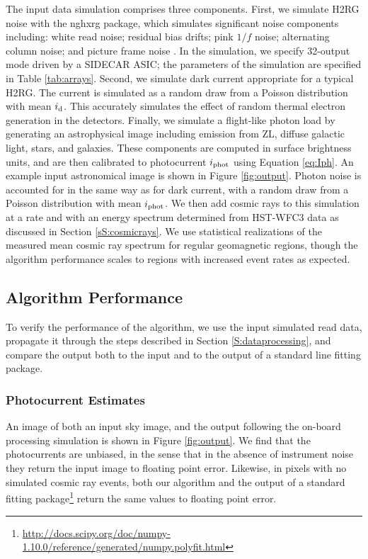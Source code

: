 \documentclass{ws-jai}
\begin{document}
The input data simulation comprises three components.  First, we
simulate H2RG noise with the {\sc nghxrg} package, which simulates
significant noise components including: white read noise; residual
bias drifts; pink $1/f$ noise; alternating column noise; and picture
frame noise \citep{Rauscher2015}. In the simulation, we specify
32-output mode driven by a SIDECAR ASIC; the parameters of the
simulation are specified in Table \ref{tab:arrays}.  Second, we
simulate dark current appropriate for a typical H2RG.  The current is
simulated as a random draw from a Poisson distribution with mean
$i_{\rm d}$.  This accurately simulates the effect of random thermal
electron generation in the detectors.  Finally, we simulate a
flight-like photon load by generating an astrophysical image including
emission from ZL, diffuse galactic light, stars, and galaxies. These
components are computed in surface brightness units, and are then
calibrated to photocurrent $i_{\rm phot}$ using Equation \ref{eq:Iph}.
An example input astronomical image is shown in Figure \ref{fig:output}.
Photon noise is accounted for in the same way as for dark current,
with a random draw from a Poisson distribution with mean
$i_{\rm phot}$.  We then add cosmic rays to this simulation at a rate
and with an energy spectrum determined from HST-WFC3 data as discussed
in Section \ref{sS:cosmicrays}.  We use statistical realizations of
the measured mean cosmic ray spectrum for regular geomagnetic regions,
though the algorithm performance scales to regions with increased event
rates as expected.

\subsection{Algorithm Performance}

To verify the performance of the algorithm, we use the input simulated
read data, propagate it through the steps described in Section
\ref{S:dataprocessing}, and compare the output both to the input and
to the output of a standard line fitting package.

\subsubsection{Photocurrent Estimates}
\label{ssS:photocurrent}

An image of both an input sky image, and the output following the
on-board processing simulation is shown in Figure \ref{fig:output}.
We find that the photocurrents are unbiased, in the sense that in the
absence of instrument noise they return the input image to floating
point error.  Likewise, in pixels with no simulated cosmic ray events,
both our algorithm and the output of a standard fitting
package\footnote{\url{http://docs.scipy.org/doc/numpy-1.10.0/reference/generated/numpy.polyfit.html}}
return the same values to floating point error.
\end{document}
